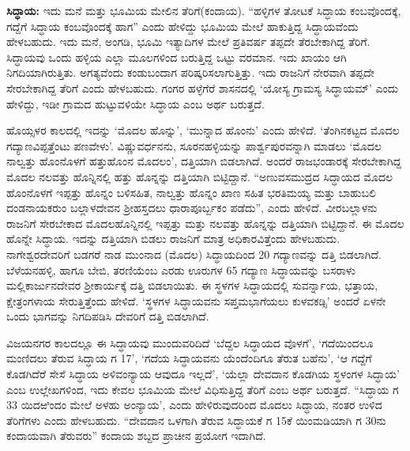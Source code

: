 \textbf{ಸಿದ್ಧಾಯ:} ಇದು ಮನೆ ಮತ್ತು ಭೂಮಿಯ ಮೇಲಿನ ತೆರಿಗೆ(ಕಂದಾಯ). “ಹಳ್ಳಿಗಳ ತೋಟಕೆ ಸಿದ್ಧಾಯ ಕಂಬವೊಂದಕ್ಕೆ, ಗದ್ದೆಗೆ ಸಿದ್ಧಾಯ ಕಂಬವೊಂದಕ್ಕೆ ಹಾಗ” ಎಂದು ಹೇಳಿದ್ದು ಭೂಮಿಯ ಮೇಲೆ ಹಾಕುತ್ತಿದ್ದ ಸಿದ್ಧಾಯವೆಂದು ಹೇಳಬಹುದು. ಇದು ಮನೆ, ಅಂಗಡಿ, ಭೂಮಿ ಇತ್ಯಾದಿಗಳ ಮೇಲೆ ಪ್ರತಿವರ್ಷ ತಪ್ಪದೇ ತೆರಬೇಕಾಗಿದ್ದ ತೆರಿಗೆ. ಸಿದ್ಧಾಯವು ಒಂದು ಹಳ್ಳಿಯ ಎಲ್ಲಾ ಮೂಲಗಳಿಂದ ಬರುತ್ತಿದ್ದ ಒಟ್ಟು ವರಮಾನ. ಇದು ಖಾಯಂ ಆಗಿ ನಿಗದಿಯಾಗಿರುತ್ತಿತು. ಅಗತ್ಯವೆಂದು ಕಂಡುಬಂದಾಗ ಪರಿಷ್ಕರಿಸಲಾಗುತ್ತಿತ್ತು. ಇದು ರಾಜನಿಗೆ ನೇರವಾಗಿ ತಪ್ಪದೇ ಸೇರಬೇಕಾಗಿದ್ದ ತೆರಿಗೆ ಎಂದು ಹೇಳಬಹುದು. ಗಂಗರ ಹಳ್ಳೆಗೆರೆ ಶಾಸನದಲ್ಲಿ ‘ಯೋಸ್ಯ ಗ್ರಾಮಸ್ಯ ಸಿದ್ಧಾಯಮ್’ ಎಂದು ಹೇಳಿದ್ದು, ಇಡೀ ಗ್ರಾಮದ ಹುಟ್ಟುವಳಿಯೇ ಸಿದ್ಧಾಯ ಎಂಬ ಅರ್ಥ ಬರುತ್ತದೆ. 

ಹೊಯ್ಸಳರ ಕಾಲದಲ್ಲಿ ಇದನ್ನು ‘ಮೊದಲ ಹೊನ್ನು’, ‘ಮುನ್ನಾದ ಹೊಂನು’ ಎಂದು ಹೇಳಿದೆ. ‘ತೆಂಗಿನಕಟ್ಟದ ಮೊದಲ ಗದ್ಯಾಣವಿಪ್ಪತ್ತೆಂಟು ಪಣವೇಳು’. ವಿಷ್ಣುವರ್ಧನನು, ಸೂರನಹಳ್ಳಿಯನ್ನು ಪಾರ್ಶ್ವಪುರವನ್ನಾಗಿ ಮಾಡಲು ‘ಮೊದಲ ನಾಲ್ವತ್ತು ಹೊಂನೊಳಗೆ ಹತ್ತುಹೊಂನ ಮೊದಲಂ’, ದತ್ತಿಯಾಗಿ ಬಿಡಲಾಗಿದೆ. ಅಂದರೆ ರಾಜಭಂಡಾರಕ್ಕೆ ಸೇರಬೇಕಾಗಿದ್ದ ಮೊದಲ ನಲವತ್ತು ಹೊನ್ನಿನಲ್ಲಿ ಹತ್ತು ಹೊನ್ನನ್ನು ದತ್ತಿಯಾಗಿ ಬಿಟ್ಟಿದ್ದಾನೆ. “ಅಣುವಸಮುದ್ರದ ಸಿದ್ಧಾಯದ ಮೊದಲ ಹೊಂನೊಳಗೆ ಇಪ್ಪತ್ತು ಹೊನ್ನಂ ಬಳಿಸಹಿತ, ನಾಲ್ವತ್ತು ಹೊನ್ನಂ ಖಾಣ ಸಹಿತ ಭರತಿಮಯ್ಯ ಮತ್ತು ಬಾಹುಬಲಿ ದಂಡನಾಯಕರುಂ ಬಲ್ಲಾಳದೇವನ ಶ‍್ರೀಹಸ್ತದಲು ಧಾರಾಪೂರ್ಬ್ಬಕಂ ಪಡೆದು”, ಎಂದು ಹೇಳಿದೆ. ವೀರಬಲ್ಲಾಳನು ರಾಜನಿಗೆ ಸೇರಬೇಕಾದ ಮೊದಲಹೊನ್ನಿನಲ್ಲಿ ಇಪ್ಪತ್ತು ಮತ್ತು ನಲವತ್ತು ಹೊನ್ನನ್ನು ದತ್ತಿಯಾಗಿ ಬಿಟ್ಟಿದ್ದಾನೆ. ಈ ಮೊದಲ ಹೊನ್ನೇ ಸಿದ್ಧಾಯ. ಇದನ್ನು ದತ್ತಿಯಾಗಿ ಬಿಡಲು ರಾಜನಿಗೆ ಮಾತ್ರ ಅಧಿಕಾರವಿತ್ತೆಂದು ಹೇಳಬಹುದು. ನಾಗೇಶ್ವರದೇವರಿಗೆ ಬಡಗರೆ ನಾಡ ಮುಂನಾದ (ಮೊದಲ) ಸಿದ್ಧಾಯದಿಂದ 20 ಗದ್ಯಾಣವನ್ನು ದತ್ತಿ ಬಿಡಲಾಗಿದೆ. ಬೆಳೆಯನಹಳ್ಳಿ, ಹಾಗೂ ಬೇಬಿ, ತರಣಿಯೆಂಬ ಎರಡು ಊರುಗಳ 65 ಗದ್ಯಾಣ ಸಿದ್ಧಾಯವನ್ನು ಬಸರಾಳು ಮಲ್ಲಿಕಾರ್ಜುನದೇವರ ಶ‍್ರೀಕಾರ್ಯಕ್ಕೆ ದತ್ತಿ ಬಿಡಲಾಯಿತು. ಈ ಸ್ಥಳಗಳ ಸಿದ್ಧಾಯದಲ್ಲಿ ಸುವರ್ನ್ನಾಯ, ಭತ್ತಾಯ, ಕ್ಷೇತ್ರಂಗಳಾಯ ಸೇರುತ್ತಿತ್ತೆಂದು ಹೇಳಿದೆ. ‘ಸ್ಥಳಗಳ ಸಿದ್ಧಾಯವನು ಸಪ್ತಮಭಾಗೆಯಲು ಕುಳವಕಡ್ಸಿ’ ಅಂದರೆ ಏಳನೇ ಒಂದು ಭಾಗವನ್ನು ನಿಗದಿಪಡಿಸಿ ದೇವರಿಗೆ ದತ್ತಿ ಬಿಡಲಾಗಿದೆ.

ವಿಜಯನಗರ ಕಾಲದಲ್ಲೂ ಈ ಸಿದ್ಧಾಯವು ಮುಂದುವರಿದಿದೆ ‘ಬೆದ್ದಲ ಸಿದ್ಧಾಯದ ವೊಳಗೆ’, ‘ಗದೆಯಿಂದಲೂ ಮಂಣಿದಲು ತೆರುವ ಸಿದ್ಧಾಯ ಗ 17’, ‘ಗದೆಯ ಸಿದ್ಧಾಯವನು ಯೆಂದೆಂದಿಗೂ ತೆರುತ ಬಹೆನು’, ‘ಆ ಗದ್ದೆಗೆ ಕೊಡಗಿದೆರೆ ಸೇಸೆ ಸಿದ್ಧಾಯ ಅಳಿವಂನ್ಯಾಯ ಆವುದೂ ಇಲ್ಲದೆ’, ‘ಯೆಲ್ಲಾ ದೇವದಾನ ಕೊಡಗಿಯ ಸ್ಥಳಂಗಳ ಸಿದ್ಧಾಯ’ ಎಂಬ ಉಲ್ಲೇಖಗಳಿಂದ, ಇದು ಕೇವಲ ಭೂಮಿಯ ಮೇಲೆ ವಿಧಿಸುತ್ತಿದ್ದ ತೆರಿಗೆ ಎಂಬ ಅರ್ಥ ಬರುತ್ತದೆ. “ಸಿದ್ಧಾಯ ಗ 33 ಯಿದಱಿಂದಂ ಮೇಲೆ ಅಳಹು ಅಂನ್ಯಾಯ’, ಎಂದು ಹೇಳಿರುವುದರಿಂದ ಮೊದಲು ಸಿದ್ಧಾಯ, ನಂತರ ಉಳಿದ ತೆರಿಗೆಗಳು ಎಂದು ಹೇಳಬಹುದು. “ದೇವದಾನ ಒಳಗಾಗಿ ತೆರುವ ಸಿದ್ಧಾಯಕೆ ಗ 15ಕೆ ಯಿಂಮಡಿಯಾಗಿ ಗ 30ನು ಕಂದಾಯವಾಗಿ ತೆರುವರು” ಕಂದಾಯ ಶಬ್ದದ ಪ್ರಾಚೀನ ಪ್ರಯೋಗ ಇದಾಗಿದೆ.

